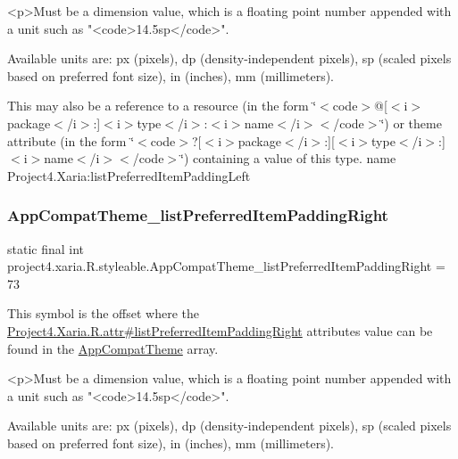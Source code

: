 \begin{DoxyVerb}      <p>Must be a dimension value, which is a floating point number appended with a unit such as "<code>14.5sp</code>".
\end{DoxyVerb}
 Available units are\+: px (pixels), dp (density-\/independent pixels), sp (scaled pixels based on preferred font size), in (inches), mm (millimeters). 

This may also be a reference to a resource (in the form \char`\"{}$<$code$>$@\mbox{[}$<$i$>$package$<$/i$>$\+:\mbox{]}$<$i$>$type$<$/i$>$\+:$<$i$>$name$<$/i$>$$<$/code$>$\char`\"{}) or theme attribute (in the form \char`\"{}$<$code$>$?\mbox{[}$<$i$>$package$<$/i$>$\+:\mbox{]}\mbox{[}$<$i$>$type$<$/i$>$\+:\mbox{]}$<$i$>$name$<$/i$>$$<$/code$>$\char`\"{}) containing a value of this type.  name Project4.\+Xaria\+:list\+Preferred\+Item\+Padding\+Left \mbox{\label{classproject4_1_1xaria_1_1R_1_1styleable_a740af6d810089e93e6259d049551e18b}} 
\subsubsection{\texorpdfstring{App\+Compat\+Theme\+\_\+list\+Preferred\+Item\+Padding\+Right}{AppCompatTheme\_listPreferredItemPaddingRight}}
{\footnotesize\ttfamily static final int project4.\+xaria.\+R.\+styleable.\+App\+Compat\+Theme\+\_\+list\+Preferred\+Item\+Padding\+Right = 73\hspace{0.3cm}{\ttfamily [static]}}

This symbol is the offset where the \hyperlink{}{Project4.\+Xaria.\+R.\+attr\#list\+Preferred\+Item\+Padding\+Right} attribute\textquotesingle{}s value can be found in the \hyperlink{classproject4_1_1xaria_1_1R_1_1styleable_aad8bec413e2350f9404e6ff0e831a85d}{App\+Compat\+Theme} array.

\begin{DoxyVerb}      <p>Must be a dimension value, which is a floating point number appended with a unit such as "<code>14.5sp</code>".
\end{DoxyVerb}
 Available units are\+: px (pixels), dp (density-\/independent pixels), sp (scaled pixels based on preferred font size), in (inches), mm (millimeters). 

